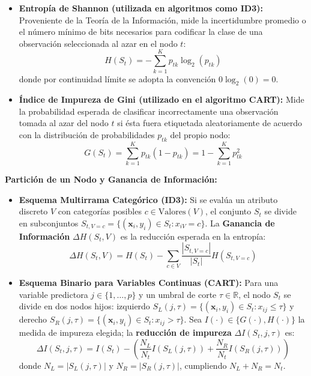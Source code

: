 \documentclass[11pt, a4paper]{article}
\begin{document}
\begin{itemize}
    \item \textbf{Entropía de Shannon (utilizada en algoritmos como ID3):}
    Proveniente de la Teoría de la Información, mide la incertidumbre promedio o el número mínimo de bits necesarios para codificar la clase de una observación seleccionada al azar en el nodo $t$:
    \begin{equation}
        H(S_t) = - \sum_{k=1}^{K} p_{tk} \log_2(p_{tk})
    \end{equation}
    donde por continuidad límite se adopta la convención $0 \log_2(0) = 0$.

    \item \textbf{Índice de Impureza de Gini (utilizado en el algoritmo CART):}
    Mide la probabilidad esperada de clasificar incorrectamente una observación tomada al azar del nodo $t$ si ésta fuera etiquetada aleatoriamente de acuerdo con la distribución de probabilidades $p_{tk}$ del propio nodo:
    \begin{equation}
        G(S_t) = \sum_{k=1}^{K} p_{tk}(1 - p_{tk}) = 1 - \sum_{k=1}^{K} p_{tk}^2
    \end{equation}
\end{itemize}

\textbf{Partición de un Nodo y Ganancia de Información:}
\begin{itemize}
    \item \textbf{Esquema Multirrama Categórico (ID3):} Si se evalúa un atributo discreto $V$ con categorías posibles $c \in \text{Valores}(V)$, el conjunto $S_t$ se divide en subconjuntos $S_{t, V=c} = \{(\mathbf{x}_i, y_i) \in S_t : x_{iV} = c\}$. La \textbf{Ganancia de Información} $\Delta H(S_t, V)$ es la reducción esperada en la entropía:
    \begin{equation}
        \Delta H(S_t, V) = H(S_t) - \sum_{c \in V} \frac{|S_{t, V=c}|}{|S_t|} H(S_{t, V=c})
    \end{equation}

    \item \textbf{Esquema Binario para Variables Continuas (CART):} Para una variable predictora $j \in \{1, \dots, p\}$ y un umbral de corte $\tau \in \mathbb{R}$, el nodo $S_t$ se divide en dos nodos hijos: izquierdo $S_L(j, \tau) = \{(\mathbf{x}_i, y_i) \in S_t : x_{ij} \le \tau\}$ y derecho $S_R(j, \tau) = \{(\mathbf{x}_i, y_i) \in S_t : x_{ij} > \tau\}$. Sea $I(\cdot) \in \{G(\cdot), H(\cdot)\}$ la medida de impureza elegida; la \textbf{reducción de impureza} $\Delta I(S_t, j, \tau)$ es:
    \begin{equation}
        \Delta I(S_t, j, \tau) = I(S_t) - \left( \frac{N_L}{N_t} I(S_L(j, \tau)) + \frac{N_R}{N_t} I(S_R(j, \tau)) \right)
    \end{equation}
    donde $N_L = |S_L(j, \tau)|$ y $N_R = |S_R(j, \tau)|$, cumpliendo $N_L + N_R = N_t$.
\end{itemize}
\end{document}
